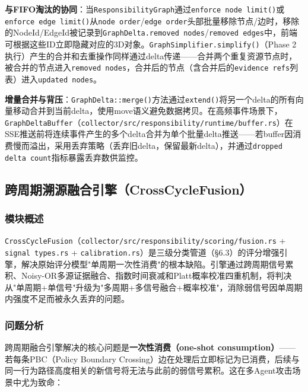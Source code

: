\documentclass[a4paper]{ctexart}
\makeatletter
\renewcommand{\_}{%
  \ifmmode
    \nfss@text{\textunderscore}%
  \else
    \textunderscore\discretionary{}{}{}%
  \fi}
\makeatother
\begin{document}
\textbf{与FIFO淘汰的协同}：当\texttt{ResponsibilityGraph}通过\texttt{enforce\_node\_limit()}或\texttt{enforce\_edge\_limit()}从\texttt{node\_order}/\texttt{edge\_order}头部批量移除节点/边时，移除的NodeId/EdgeId被记录到\texttt{GraphDelta.removed\_nodes}/\texttt{removed\_edges}中，前端可根据这些ID立即隐藏对应的3D对象。\texttt{GraphSimplifier.simplify()}（Phase 2执行）产生的合并和去重操作同样通过delta传递——合并两个重复资源节点时，被合并的节点进入\texttt{removed\_nodes}，合并后的节点（含合并后的\texttt{evidence\_refs}列表）进入\texttt{updated\_nodes}。


\textbf{增量合并与背压}：\texttt{GraphDelta::merge()}方法通过\texttt{extend()}将另一个delta的所有向量移动合并到当前delta，使用move语义避免数据拷贝。在高频事件场景下，\texttt{GraphDeltaBuffer}（\texttt{collector/src/responsibility/runtime/buffer.rs}）在SSE推送前将连续事件产生的多个delta合并为单个批量delta推送——若buffer因消费慢而溢出，采用丢弃策略（丢弃旧delta，保留最新delta），并通过\texttt{dropped\_delta\_count}指标暴露丢弃数供监控。


\subsection{跨周期溯源融合引擎（CrossCycleFusion）}



\subsubsection{模块概述}



\texttt{CrossCycleFusion}（\texttt{collector/src/responsibility/scoring/fusion.rs} + \texttt{signal\_types.rs} + \texttt{calibration.rs}）是三级分类管道（§6.3）的评分增强引擎，解决原始评分模型"单周期一次性消费"的根本缺陷。引擎通过跨周期信号累积、Noisy-OR多源证据融合、指数时间衰减和Platt概率校准四重机制，将判决从"单周期+单信号"升级为"多周期+多信号融合+概率校准"，消除弱信号因单周期内强度不足而被永久丢弃的问题。


\subsubsection{问题分析}



跨周期融合引擎解决的核心问题是\textbf{一次性消费（one-shot consumption）}——若每条PBC（Policy Boundary Crossing）边在处理后立即标记为已消费，后续与同一行为路径高度相关的新信号将无法与此前的弱信号累积。这在多Agent攻击场景中尤为致命：
\end{document}

